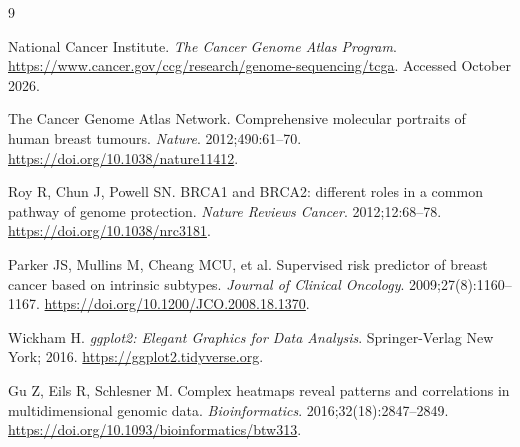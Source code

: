 \documentclass[11pt]{article}
\begin{document}
\begin{thebibliography}{9}

National Cancer Institute.
\textit{The Cancer Genome Atlas Program}.
\url{https://www.cancer.gov/ccg/research/genome-sequencing/tcga}.
Accessed October 2026.

The Cancer Genome Atlas Network.
Comprehensive molecular portraits of human breast tumours.
\textit{Nature}. 2012;490:61--70.
\url{https://doi.org/10.1038/nature11412}.

Roy R, Chun J, Powell SN.
BRCA1 and BRCA2: different roles in a common pathway of genome protection.
\textit{Nature Reviews Cancer}. 2012;12:68--78.
\url{https://doi.org/10.1038/nrc3181}.

Parker JS, Mullins M, Cheang MCU, et al.
Supervised risk predictor of breast cancer based on intrinsic subtypes.
\textit{Journal of Clinical Oncology}. 2009;27(8):1160--1167.
\url{https://doi.org/10.1200/JCO.2008.18.1370}.

Wickham H.
\textit{ggplot2: Elegant Graphics for Data Analysis}.
Springer-Verlag New York; 2016.
\url{https://ggplot2.tidyverse.org}.

Gu Z, Eils R, Schlesner M.
Complex heatmaps reveal patterns and correlations in multidimensional genomic data.
\textit{Bioinformatics}. 2016;32(18):2847--2849.
\url{https://doi.org/10.1093/bioinformatics/btw313}.

\end{thebibliography}
\end{document}
